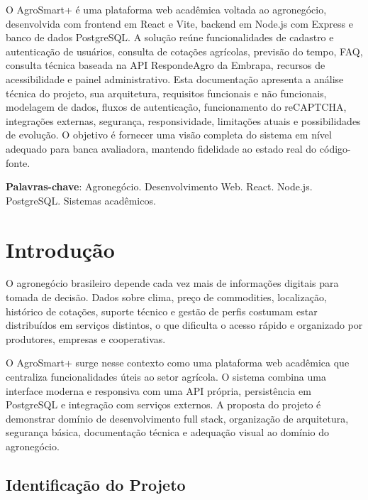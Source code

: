 \documentclass[
  12pt,
  oneside,
  a4paper,
  brazil
]{abntex2}
\begin{document}
\frenchspacing

\imprimircapa
\imprimirfolhaderosto

\begin{resumo}
O AgroSmart+ é uma plataforma web acadêmica voltada ao agronegócio, desenvolvida com frontend em React e Vite, backend em Node.js com Express e banco de dados PostgreSQL. A solução reúne funcionalidades de cadastro e autenticação de usuários, consulta de cotações agrícolas, previsão do tempo, FAQ, consulta técnica baseada na API RespondeAgro da Embrapa, recursos de acessibilidade e painel administrativo. Esta documentação apresenta a análise técnica do projeto, sua arquitetura, requisitos funcionais e não funcionais, modelagem de dados, fluxos de autenticação, funcionamento do reCAPTCHA, integrações externas, segurança, responsividade, limitações atuais e possibilidades de evolução. O objetivo é fornecer uma visão completa do sistema em nível adequado para banca avaliadora, mantendo fidelidade ao estado real do código-fonte.

\textbf{Palavras-chave}: Agronegócio. Desenvolvimento Web. React. Node.js. PostgreSQL. Sistemas acadêmicos.
\end{resumo}

\tableofcontents*
\cleardoublepage

\textual

\chapter{Introdução}

O agronegócio brasileiro depende cada vez mais de informações digitais para tomada de decisão. Dados sobre clima, preço de commodities, localização, histórico de cotações, suporte técnico e gestão de perfis costumam estar distribuídos em serviços distintos, o que dificulta o acesso rápido e organizado por produtores, empresas e cooperativas.

O AgroSmart+ surge nesse contexto como uma plataforma web acadêmica que centraliza funcionalidades úteis ao setor agrícola. O sistema combina uma interface moderna e responsiva com uma API própria, persistência em PostgreSQL e integração com serviços externos. A proposta do projeto é demonstrar domínio de desenvolvimento full stack, organização de arquitetura, segurança básica, documentação técnica e adequação visual ao domínio do agronegócio.

\section{Identificação do Projeto}
\end{document}
